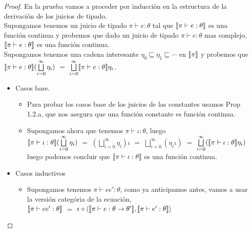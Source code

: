 \begin{proof}

En la prueba vamos a proceder por inducci\'on en la estructura de la derivaci\'on 
de los juicios de tipado.\\

Supongamos tenemos un juicio de tipado $\pi \vdash e : \theta$ tal que
$\llbracket \pi \vdash e : \theta \rrbracket$ es una funci\'on continua y probemos
que dado un juicio de tipado $\pi \vdash e : \theta$ mas complejo,
$\llbracket \pi \vdash e : \theta \rrbracket$ es una funci\'on continua.\\

Supongamos tenemos una cadena interesante
$\eta_0 \sqsubseteq \eta_1 \sqsubseteq \cdots$ en $\llbracket \pi \rrbracket$ y probemos
que $\llbracket \pi \vdash e : \theta \rrbracket(\bigsqcup\limits^{\infty}_{i=0} \eta_i)$
$=$ $\bigsqcup\limits^{\infty}_{i=0} \llbracket \pi \vdash e : \theta \rrbracket\eta_i$.

\begin{itemize}
\item Casos base.

\begin{itemize}
\item Para probar los casos base de los juicios de las constantes usamos Prop 1.2.a, 
que nos asegura que una funci\'on constante es funci\'on continua. 

\item Supongamos ahora que tenemos $\pi \vdash \iota : \theta$, luego \\

$\llbracket \pi \vdash \iota : \theta \rrbracket (\bigsqcup\limits^{\infty}_{i=0} \eta_i)$ $=$
$(\bigsqcup\limits^{\infty}_{i=0} \eta_i)\iota$ $=$
$\bigsqcup\limits^{\infty}_{i=0} (\eta_i \iota)$ $=$
$\bigsqcup\limits^{\infty}_{i=0} (\llbracket \pi \vdash \iota : \theta \rrbracket\eta_i)$\\

luego podemos concluir que $\llbracket \pi \vdash \iota : \theta \rrbracket$ es una funci\'on
continua.
\end{itemize}

\item Casos inductivos
\begin{itemize}

\item Supongamos tenemos $\pi \vdash ee' : \theta$, como ya anticipamos antes, vamos a
usar la versi\'on categ\'oria de la ecuaci\'on, \\

$\llbracket \pi \vdash ee' : \theta \rrbracket$ $=$
$\epsilon \circ \langle \llbracket \pi \vdash e : \theta \rightarrow \theta' \rrbracket
					     ,\llbracket \pi \vdash e' : \theta \rrbracket \rangle$\\


\end{itemize}
\end{itemize}
\end{proof}
